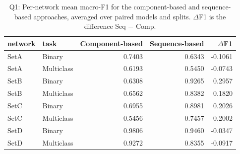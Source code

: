 \begin{table}
\caption{Q1: Per-network mean macro-F1 for the component-based and sequence-based approaches, averaged over paired models and splits. $\Delta$F1 is the difference Seq $-$ Comp.}
\label{tab:q1_per_network}
\begin{tabular}{llrrr}
\toprule
network & task & Component-based & Sequence-based & $\Delta$F1 \\
\midrule
SetA & Binary & 0.7403 & 0.6343 & -0.1061 \\
SetA & Multiclass & 0.6193 & 0.5450 & -0.0743 \\
SetB & Binary & 0.6308 & 0.9265 & 0.2957 \\
SetB & Multiclass & 0.6562 & 0.8382 & 0.1820 \\
SetC & Binary & 0.6955 & 0.8981 & 0.2026 \\
SetC & Multiclass & 0.5456 & 0.7457 & 0.2002 \\
SetD & Binary & 0.9806 & 0.9460 & -0.0347 \\
SetD & Multiclass & 0.9272 & 0.8355 & -0.0917 \\
\bottomrule
\end{tabular}
\end{table}
